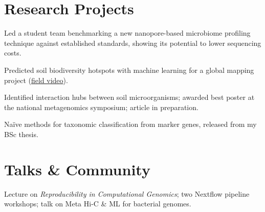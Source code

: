 \documentclass[]{deedy-resume-openfont}
\begin{document}
\hfill
\begin{minipage}[t]{0.66\textwidth}

\section{Research Projects}

\begin{tightemize}
\item Led a student team benchmarking a new nanopore-based microbiome profiling technique against established standards, showing its potential to lower sequencing costs.
\end{tightemize}
\sectionsep

\begin{tightemize}
\item Predicted soil biodiversity hotspots with machine learning for a global mapping project (\href{\MySpunVideoURL{}}{field video}).
\end{tightemize}
\sectionsep

\begin{tightemize}
\item Identified interaction hubs between soil microorganisms; awarded best poster at the national metagenomics symposium; article in preparation.
\end{tightemize}
\sectionsep

\begin{tightemize}
\item Naïve methods for taxonomic classification from marker genes, released from my BSc thesis.
\end{tightemize}
\sectionsep

\section{Talks \& Community}

\location{\WhenCrabs{}}
\begin{tightemize}
\item Lecture on \textit{Reproducibility in Computational Genomics}; two Nextflow pipeline workshops; talk on Meta Hi-C \& ML for bacterial genomes.
\end{tightemize}
\sectionsep


\end{minipage}
\end{document}
